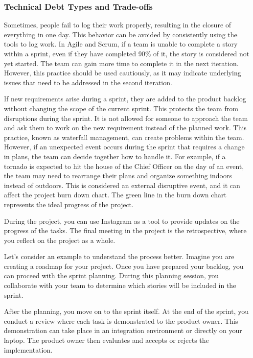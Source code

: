 \subsubsection{Technical Debt Types and Trade-offs}

Sometimes, people fail to log their work properly, resulting in the
closure of everything in one day. This behavior can be avoided by
consistently using the tools to log work. In Agile and Scrum, if a team
is unable to complete a story within a sprint, even if they have
completed 90\% of it, the story is considered not yet started. The team
can gain more time to complete it in the next iteration. However, this
practice should be used cautiously, as it may indicate underlying issues
that need to be addressed in the second iteration.

If new requirements arise during a sprint, they are added to the product
backlog without changing the scope of the current sprint. This protects
the team from disruptions during the sprint. It is not allowed for
someone to approach the team and ask them to work on the new requirement
instead of the planned work. This practice, known as waterfall
management, can create problems within the team. However, if an
unexpected event occurs during the sprint that requires a change in
plans, the team can decide together how to handle it. For example, if a
tornado is expected to hit the house of the Chief Officer on the day of
an event, the team may need to rearrange their plans and organize
something indoors instead of outdoors. This is considered an external
disruptive event, and it can affect the project burn down chart. The
green line in the burn down chart represents the ideal progress of the
project.

During the project, you can use Instagram as a tool to provide updates
on the progress of the tasks. The final meeting in the project is the
retrospective, where you reflect on the project as a whole.

Let's consider an example to understand the process better. Imagine you
are creating a roadmap for your project. Once you have prepared your
backlog, you can proceed with the sprint planning. During this planning
session, you collaborate with your team to determine which stories will
be included in the sprint.

After the planning, you move on to the sprint itself. At the end of the
sprint, you conduct a review where each task is demonstrated to the
product owner. This demonstration can take place in an integration
environment or directly on your laptop. The product owner then evaluates
and accepts or rejects the implementation.

